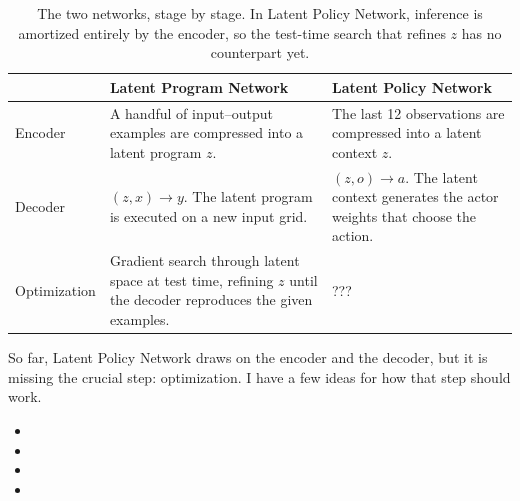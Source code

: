 \documentclass{article}
\begin{document}
\begin{table}
\begin{tabular}{lll}
   & Latent Program Network & Latent Policy Network \\
  \hline
  Encoder
    & A handful of input--output examples are compressed into a latent
      program $z$.
    & The last 12 observations are compressed into a latent context $z$. \\
  Decoder
    & $(z, x) \to y$. The latent program is executed on a new input grid.
    & $(z, o) \to a$. The latent context generates the actor weights that
      choose the action. \\
  Optimization
    & Gradient search through latent space at test time, refining $z$ until
      the decoder reproduces the given examples.
    & ??? \\
\end{tabular}
\caption{The two networks, stage by stage. In Latent Policy Network, inference is
amortized entirely by the encoder, so the test-time search that refines $z$ has no
counterpart yet.}
\end{table}

So far, Latent Policy Network draws on the encoder and the decoder, but it is
missing the crucial step: optimization. I have a few ideas for how that step
should work.

\begin{itemize}
  \item {}

  \item {}

  \item {}

  \item {}
\end{itemize}
\end{document}
